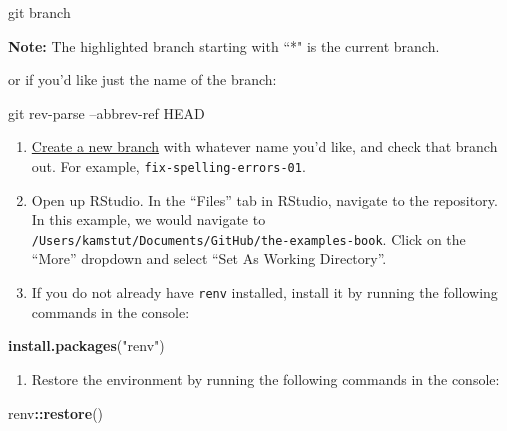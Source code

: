\documentclass[]{book}
\newenvironment{Shaded}{\begin{snugshade}}{\end{snugshade}}
\newcommand{\KeywordTok}[1]{\textcolor[rgb]{0.13,0.29,0.53}{\textbf{#1}}}
\newcommand{\StringTok}[1]{\textcolor[rgb]{0.31,0.60,0.02}{#1}}
\newcommand{\FunctionTok}[1]{\textcolor[rgb]{0.00,0.00,0.00}{#1}}
\newcommand{\OperatorTok}[1]{\textcolor[rgb]{0.81,0.36,0.00}{\textbf{#1}}}
\newcommand{\NormalTok}[1]{#1}
\providecommand{\tightlist}{%
  \setlength{\itemsep}{0pt}\setlength{\parskip}{0pt}}
\begin{document}
\begin{Shaded}
\begin{Highlighting}[]
\FunctionTok{git}\NormalTok{ branch}
\end{Highlighting}
\end{Shaded}

\textbf{Note:} The highlighted branch starting with ``*" is the current
branch.

or if you'd like just the name of the branch:

\begin{Shaded}
\begin{Highlighting}[]
\FunctionTok{git}\NormalTok{ rev-parse --abbrev-ref HEAD}
\end{Highlighting}
\end{Shaded}

\begin{enumerate}
\def\labelenumi{\arabic{enumi}.}
\setcounter{enumi}{6}
\item
  \protect\hyperlink{git-create-new-branch}{Create a new branch} with
  whatever name you'd like, and check that branch out. For example,
  \texttt{fix-spelling-errors-01}.
\item
  Open up RStudio. In the ``Files'' tab in RStudio, navigate to the
  repository. In this example, we would navigate to
  \texttt{/Users/kamstut/Documents/GitHub/the-examples-book}. Click on
  the ``More'' dropdown and select ``Set As Working Directory''.
\item
  If you do not already have \texttt{renv} installed, install it by
  running the following commands in the console:
\end{enumerate}

\begin{Shaded}
\begin{Highlighting}[]
\KeywordTok{install.packages}\NormalTok{(}\StringTok{"renv"}\NormalTok{)}
\end{Highlighting}
\end{Shaded}

\begin{enumerate}
\def\labelenumi{\arabic{enumi}.}
\setcounter{enumi}{9}
\tightlist
\item
  Restore the environment by running the following commands in the
  console:
\end{enumerate}

\begin{Shaded}
\begin{Highlighting}[]
\NormalTok{renv}\OperatorTok{::}\KeywordTok{restore}\NormalTok{()}
\end{Highlighting}
\end{Shaded}
\end{document}
